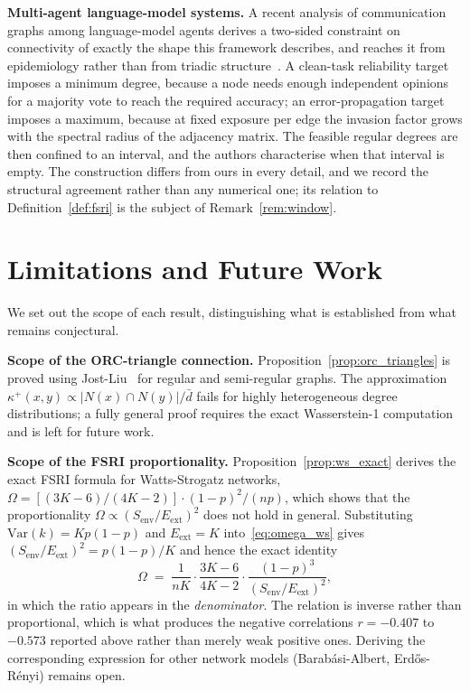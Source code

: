 \documentclass[11pt,a4paper]{article}
\begin{document}
\textbf{Multi-agent language-model systems.} A recent analysis of communication
graphs among language-model agents derives a two-sided constraint on
connectivity of exactly the shape this framework describes, and reaches it from
epidemiology rather than from triadic structure~\cite{niu2026}. A clean-task
reliability target imposes a minimum degree, because a node needs enough
independent opinions for a majority vote to reach the required accuracy; an
error-propagation target imposes a maximum, because at fixed exposure per edge
the invasion factor grows with the spectral radius of the adjacency matrix.
The feasible regular degrees are then confined to an interval, and the authors
characterise when that interval is empty. The construction differs from ours in
every detail, and we record the structural agreement rather than any numerical
one; its relation to Definition~\ref{def:fsri} is the subject of
Remark~\ref{rem:window}.

\section{Limitations and Future Work}
\label{sec:limitations}

We set out the scope of each result, distinguishing what is established
from what remains conjectural.

\textbf{Scope of the ORC-triangle connection.} Proposition~\ref{prop:orc_triangles} is proved
using Jost-Liu~\cite{jost2014} for regular and semi-regular graphs. The
approximation $\kappa^+(x,y) \propto |N(x) \cap N(y)|/\bar{d}$ fails for
highly heterogeneous degree distributions; a fully general proof requires
the exact Wasserstein-1 computation and is left for future work.

\textbf{Scope of the FSRI proportionality.} Proposition~\ref{prop:ws_exact} derives the
exact FSRI formula for Watts-Strogatz networks,
$\Omega = [(3K-6)/(4K-2)] \cdot (1-p)^2/(np)$, which shows that the
proportionality $\Omega \propto (S_\text{env}/E_\text{ext})^2$ does not hold
in general. Substituting $\mathrm{Var}(k) = Kp(1-p)$ and $E_\text{ext} = K$
into~\eqref{eq:omega_ws} gives $(S_\text{env}/E_\text{ext})^2 = p(1-p)/K$ and
hence the exact identity
\[
\Omega \;=\; \frac{1}{nK}\cdot\frac{3K-6}{4K-2}\cdot
\frac{(1-p)^3}{(S_\text{env}/E_\text{ext})^{2}},
\]
in which the ratio appears in the \emph{denominator}. The relation is inverse
rather than proportional, which is what produces the negative correlations
$r = -0.407$ to $-0.573$ reported above rather than merely weak positive ones.
Deriving the corresponding expression for other network models
(Barabási-Albert, Erdős-Rényi) remains open.
\end{document}
